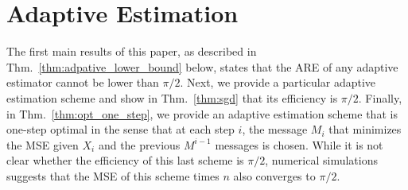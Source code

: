 \documentclass[letterpaper, conference]{IEEEtran}      %
\begin{document}
\section{Adaptive Estimation \label{sec:sequential}}

The first main results of this paper, as described in Thm.~\ref{thm:adpative_lower_bound} below, states that the ARE of any adaptive estimator cannot be lower than $\pi/2$. Next, we provide a particular adaptive estimation scheme and show in Thm.~\ref{thm:sgd} that its efficiency is $\pi/2$. Finally, in Thm.~\ref{thm:opt_one_step}, we provide an adaptive estimation scheme that is one-step optimal in the sense that at each step $i$, the message $M_i$ that minimizes the MSE given $X_i$ and the previous $M^{i-1}$ messages is chosen. While it is not clear whether the efficiency of this last scheme is $\pi/2$, numerical simulations suggests that the MSE of this scheme times $n$ also converges to $\pi/2$.

%  
%
%
%
%  

\end{document}
